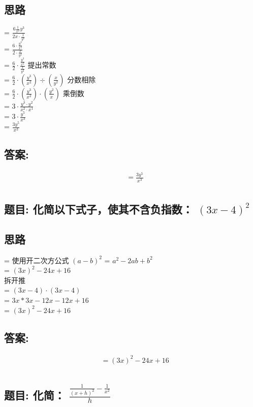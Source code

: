 \documentclass[12pt]{article}
\begin{document}
\subsection*{思路}
= $\frac{6\frac{1}{x^{2}}y^{3}}{2x \cdot \frac{1}{y^{2}}}$\\
= $\frac{6 \cdot \frac{y^{3}}{x^{2}}}{2 \cdot \frac{x}{y^{2}}}$\\
= $\frac{6}{2} \cdot \frac{\frac{y^{3}}{x^{2}}}{\frac{x}{y^{2}}}$  提出常数\\
= $\frac{6}{2} \cdot (\frac{y^{3}}{x^{2}})÷(\frac{x}{y^{2}})$      分数相除\\
= $\frac{6}{2} \cdot (\frac{y^{3}}{x^{2}})\cdot(\frac{y^{2}}{x})$  乘倒数\\
= $3 \cdot \frac{y^{3} \cdot y^{2}}{x^{2} \cdot x^{1}}$\\
= $3 \cdot \frac{y^{5}}{x^{3}}$\\
= $\frac{3y^{5}}{x^{3}}$\\
\subsection*{答案:}
\begin{align*}
  &= \frac{3y^{5}}{x^{3}} \\
\end{align*}

\subsection*{题目: 化简以下式子，使其不含负指数： $(3x-4)^{2}$}
\subsection*{思路}
= 使用开二次方公式 $(a-b)^{2}$ =  $a^{2}-2ab + b^{2}$\\
= $(3x)^{2} -24x + 16$\\
拆开推\\
= $(3x-4) \cdot (3x-4)$\\
= $3x * 3x - 12x - 12x  + 16$\\
= $(3x)^{2} -24x + 16$\\
\subsection*{答案:}
\begin{align*}
  &= (3x)^{2} -24x + 16 \\
\end{align*}

\subsection*{题目: 化简： $\frac{\frac{1}{(x+h)^{2}} - \frac{1}{x^{2}}}{h}$}
\end{document}
